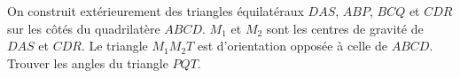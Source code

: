 On construit extérieurement des triangles équilatéraux $DAS$, $ABP$, $BCQ$ et $CDR$ sur les côtés du quadrilatère $ABCD$. $M_1$ et $M_2$ sont les centres de gravité de $DAS$ et $CDR$. Le triangle $M_1M_2T$ est d'orientation opposée à celle de $ABCD$. Trouver les angles du triangle $PQT$.
